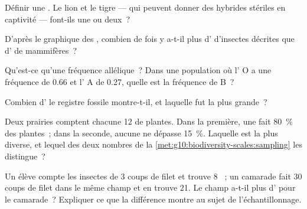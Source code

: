 \begin{exercise}[$\star$]\label{exo:g10:biodiversity-scales:2}
Définir une . Le lion et le tigre --- qui peuvent donner des
hybrides stériles en captivité --- font-ils une  ou deux~?
\end{exercise}

\begin{exercise}[$\star$]\label{exo:g10:biodiversity-scales:3}
D'après le graphique des , combien de fois y a-t-il plus
d' d'insectes décrites que d' de mammifères~?
\end{exercise}

\begin{exercise}[$\star$]\label{exo:g10:biodiversity-scales:4}
Qu'est-ce qu'une fréquence allélique~? Dans une population où l'
O a une fréquence de 0.66 et l' A de 0.27, quelle est la
fréquence de B~?
\end{exercise}

\begin{exercise}[$\star$]\label{exo:g10:biodiversity-scales:5}
Combien d' le registre fossile montre-t-il, et
laquelle fut la plus grande~?
\end{exercise}

\begin{exercise}[$\star\star$]\label{exo:g10:biodiversity-scales:6}
Deux prairies comptent chacune 12  de plantes. Dans la première,
une  fait 80~\% des plantes~; dans la seconde, aucune ne dépasse
15~\%. Laquelle est la plus diverse, et lequel des deux nombres de la
\cref{met:g10:biodiversity-scales:sampling} les distingue~?
\end{exercise}

\begin{exercise}[$\star\star$]\label{exo:g10:biodiversity-scales:7}
Un élève compte les insectes de 3 coups de filet et trouve 8 ~;
un camarade fait 30 coups de filet dans le même champ et en trouve 21.
Le champ a-t-il plus d' pour le camarade~? Expliquer ce que la
différence montre au sujet de l'échantillonnage.
\end{exercise}

